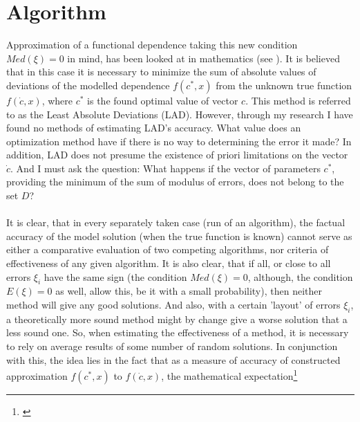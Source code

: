 \section{Algorithm}

Approximation of a functional dependence taking this new condition $Med(\xi)=0$ in mind, has been looked at in mathematics (see \citep{balk_2010}). It is believed that in this case it is necessary to minimize the sum of absolute values of deviations of the modelled dependence $f(c^{*},x)$ from the unknown true function $f(\dot{c},x)$, where $c^{*}$ is the found optimal value of  vector $c$. This method is referred to as the Least Absolute Deviations (LAD). However, through my research I have found no methods of estimating LAD's accuracy. What value does an optimization method have if there is no way to determining the error it made? In addition, LAD does not presume the existence of priori limitations on the vector $\dot{c}$. And I must ask the question: What happens if the vector of parameters $c^{*}$, providing the minimum of the sum of modulus of errors, does not belong to the set $D$? \\
\\
It is clear, that in every separately taken case (run of an algorithm), the factual accuracy of the model solution (when the true function is known) cannot serve as either a comparative evaluation of two competing algorithms, nor criteria of effectiveness of any given algorithm. It is also clear, that if all, or close to all errors $\xi_{i}$ have the same sign (the condition $Med(\xi)=0$, although, the condition $E(\xi)=0$ as well, allow this, be it with a small probability), then neither method will give any good solutions. And also, with a certain 'layout' of errors $\xi_{i}$, a theoretically more sound method might by change give a worse solution that a less sound one. So, when estimating the effectiveness of a method, it is necessary to rely on average results of some number of random solutions. In conjunction with this, the idea lies in the fact that as a measure of accuracy of constructed approximation $f(c^{*},x)$ to $f(\dot{c},x)$, the mathematical expectation\footnote{\cite{Ross_2007}}

